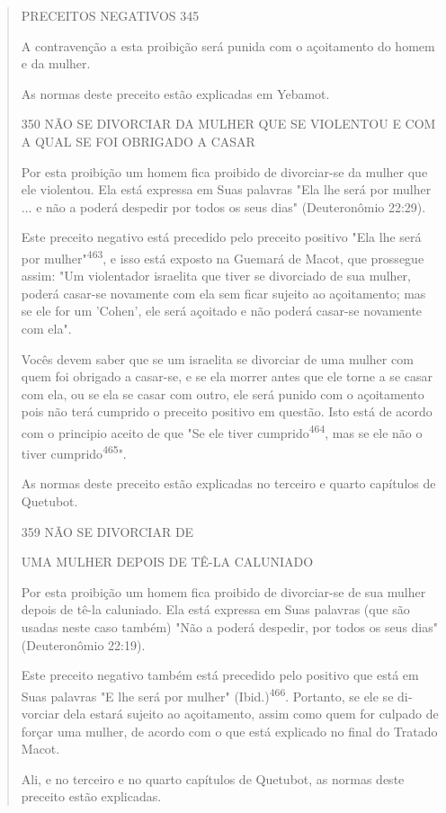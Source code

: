 \begin{quote}
PRECEITOS NEGATIVOS 345

A contravenção a esta proibição será punida com o açoitamento do homem e
da mulher.

As normas deste preceito estão explicadas em Yebamot.

350 NÃO SE DIVORCIAR DA MULHER QUE SE VIOLENTOU E COM A QUAL SE FOI
OBRIGADO A CASAR

Por esta proibição um homem fica proibido de divorciar-se da mu­lher que
ele violentou. Ela está expressa em Suas palavras "Ela lhe será por
mu­lher ... e não a poderá despedir por todos os seus dias"
(Deuteronômio 22:29).

Este preceito negativo está precedido pelo preceito positivo "Ela lhe
será por mulher"\textsuperscript{463}, e isso está exposto na Guemará de
Macot, que prossegue assim: "Um violentador israelita que tiver se
divorciado de sua mulher, poderá casar-se novamente com ela sem ficar
sujeito ao açoitamento; mas se ele for um 'Cohen', ele será açoitado e
não poderá casar-se novamente com ela".

Vocês devem saber que se um israelita se divorciar de uma mulher com
quem foi obrigado a casar-se, e se ela morrer antes que ele torne a se
casar com ela, ou se ela se casar com outro, ele será punido com o
açoitamento pois não terá cumprido o preceito positivo em questão. Isto
está de acordo com o principio aceito de que "Se ele tiver
cumprido\textsuperscript{464}, mas se ele não o tiver
cumprido\textsuperscript{465}".

As normas deste preceito estão explicadas no terceiro e quarto
capí­tulos de Quetubot.

359 NÃO SE DIVORCIAR DE

UMA MULHER DEPOIS DE TÊ-LA CALUNIADO

Por esta proibição um homem fica proibido de divorciar-se de sua mulher
depois de tê-la caluniado. Ela está expressa em Suas palavras (que são
usadas neste caso também) "Não a poderá despedir, por todos os seus
dias" (Deuteronômio 22:19).

Este preceito negativo também está precedido pelo positivo que es­tá em
Suas palavras "E lhe será por mulher" (Ibid.)\textsuperscript{466}.
Portanto, se ele se di­vorciar dela estará sujeito ao açoitamento, assim
como quem for culpado de forçar uma mulher, de acordo com o que está
explicado no final do Tratado Macot.

Ali, e no terceiro e no quarto capítulos de Quetubot, as normas des­te
preceito estão explicadas.
\end{quote}


